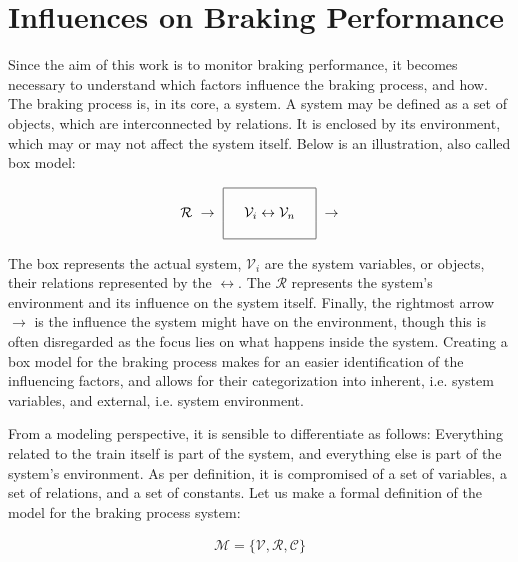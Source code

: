 \section{Influences on Braking Performance}
\label{sec:InfluencesOnBraking}
\par\noindent
Since the aim of this work is to monitor braking performance, it becomes necessary to understand which factors influence the braking process, and how. The braking process is, in its core, a system. A system may be defined as a set of objects, which are interconnected by relations. It is enclosed by its environment, which may or may not affect the system itself. Below is an illustration, also called box model:

\begin{align*}
	\displaystyle {\mathcal {R}}\ 
	\rightarrow \ 
	{\begin{array}{|c|}\hline \quad \\\quad {\mathcal {V}}_{i}\leftrightarrow {\mathcal {V}}_{n}\quad \\\quad \\\hline \end{array}}\ 
	\rightarrow
\end{align*}

\par\noindent
The box represents the actual system, ${\mathcal{V}}_{i}$ are the system variables, or objects, their relations represented by the $\leftrightarrow$. The ${\mathcal{R}}$ represents the system's environment and its influence on the system itself. Finally, the rightmost arrow $\rightarrow$ is the influence the system might have on the environment, though this is often disregarded as the focus lies on what happens inside the system. Creating a box model for the braking process makes for an easier identification of the influencing factors, and allows for their categorization into inherent, i.e. system variables, and external, i.e. system environment.
\par
From a modeling perspective, it is sensible to differentiate as follows: Everything related to the train itself is part of the system, and everything else is part of the system's environment. As per definition, it is compromised of a set of variables, a set of relations, and a set of constants. Let us make a formal definition of the model for the braking process system:

\begin{align*}
{\mathcal {M}} = \{ {\mathcal{V}}, {\mathcal{R}}, {\mathcal{C}} \}
\end{align*}

